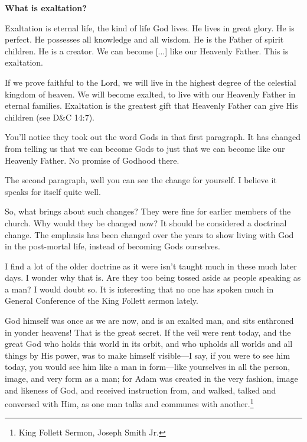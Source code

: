 \documentclass{article}
\begin{document}
\begin{displayquote}
\textbf{What is exaltation?}

Exaltation is eternal life, the kind of life God lives. He lives in great glory. 
He is perfect. He possesses all knowledge and all wisdom. He is the 
Father of spirit children. He is a creator. We can become [...] like our 
Heavenly Father. This is exaltation.

If we prove faithful to the Lord, we will live in the highest degree of the 
celestial kingdom of heaven. We will become exalted, to live with our 
Heavenly Father in eternal families. Exaltation is the greatest gift that 
Heavenly Father can give His children (see D\&C 14:7).\cite[275-280]{gp2}
\end{displayquote}

You'll notice they took out the word Gods in that first paragraph. It has 
changed from telling us that we can become Gods to just that we can become
like our Heavenly Father. No promise of Godhood there.

The second paragraph, well you can see the change for yourself. I believe it 
speaks for itself quite well.

So, what brings about such changes? They were fine for earlier members of the
church. Why would they be changed now? It should be considered a doctrinal 
change. The emphasis has been changed over the years to show living with God 
in the post-mortal life, instead of becoming Gods ourselves.

I find a lot of the older doctrine as it were isn't taught much in these much 
later days. I wonder why that is. Are they too being tossed aside as people 
speaking as a man? I would doubt so. It is interesting that no one has spoken 
much in General Conference of the King Follett sermon lately.

\begin{displayquote}
God himself was once as we are now, and is an exalted man, and sits enthroned 
in yonder heavens! That is the great secret. If the veil were rent today, 
and the great God who holds this world in its orbit, and who upholds all 
worlds and all things by His power, was to make himself visible—I say, if 
you were to see him today, you would see him like a man in form—like yourselves 
in all the person, image, and very form as a man; for Adam was created in the 
very fashion, image and likeness of God, and received instruction from, and 
walked, talked and conversed with Him, as one man talks and communes with 
another.\footnote{King Follett Sermon, Joseph Smith Jr.}
\end{displayquote}
\end{document}
